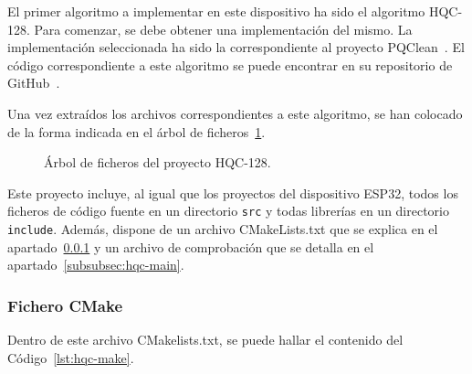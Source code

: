 El primer algoritmo a implementar en este dispositivo ha sido el algoritmo HQC-128.
Para comenzar, se debe obtener una implementación del mismo.
La implementación seleccionada ha sido la correspondiente al proyecto PQClean~\cite{SSR:KSSW22}.
El código correspondiente a este algoritmo se puede encontrar en su repositorio de GitHub~\cite{pqclean-github}.

Una vez extraídos los archivos correspondientes a este algoritmo, se han colocado de la forma indicada en el árbol de ficheros~\ref{tree:hqc}.

\begin{figure}[H]
\centering
{}
\caption{Árbol de ficheros del proyecto HQC-128.}
\label{tree:hqc}
\end{figure}

Este proyecto incluye, al igual que los proyectos del dispositivo ESP32, todos los ficheros de código fuente en un directorio \texttt{src} y todas librerías en un directorio \texttt{include}.
Además, dispone de un archivo CMakeLists.txt que se explica en el apartado~\ref{subsubsec:hqc-cmake} y un archivo de comprobación que se detalla en el apartado~\ref{subsubsec:hqc-main}.


\subsubsection{Fichero CMake}\label{subsubsec:hqc-cmake}

Dentro de este archivo CMakelists.txt, se puede hallar el contenido del Código~\ref{lst:hqc-make}.

